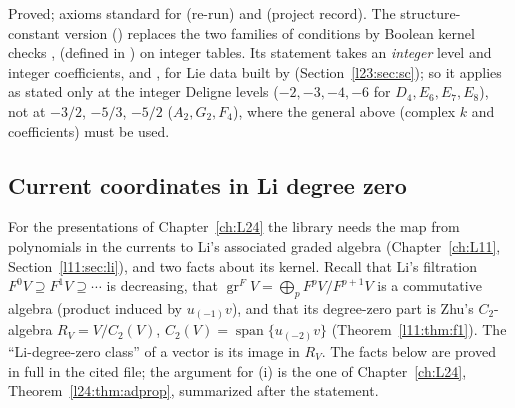 \begin{status}
Proved; axioms standard for  (re-run) and  (project record).
The structure-constant version  () replaces the two families of
conditions by Boolean kernel checks ,  (defined in ) on integer tables. Its
statement takes an \emph{integer} level and integer coefficients,  and , for Lie
data built by  (Section~\ref{l23:sec:sc}); so it applies as stated only at the integer Deligne levels
($-2,-3,-4,-6$ for $D_4,E_6,E_7,E_8$), not at $-3/2$, $-5/3$, $-5/2$ ($A_2,G_2,F_4$), where the general
 above (complex $k$ and coefficients) must be used.
\end{status}

\subsection{Current coordinates in Li degree zero}

For the presentations of Chapter~\ref{ch:L24} the library needs the map from polynomials in the currents to Li's associated graded
algebra (Chapter~\ref{ch:L11}, Section~\ref{l11:sec:li}), and two facts about its kernel. Recall that Li's filtration
$F^0V\supseteq F^1V\supseteq\cdots$ is decreasing, that $\operatorname{gr}^FV=\bigoplus_pF^pV/F^{p+1}V$ is a commutative algebra
(product induced by $u_{(-1)}v$), and that its degree-zero part is Zhu's $C_2$-algebra $R_V=V/C_2(V)$, $C_2(V)=\operatorname{span}\{u_{(-2)}v\}$
(Theorem~\ref{l11:thm:f1}). The ``Li-degree-zero class'' of a vector is its image in $R_V$. The facts below are proved in full in the
cited file; the argument for (i) is the one of Chapter~\ref{ch:L24}, Theorem~\ref{l24:thm:adprop}, summarized after the statement.

